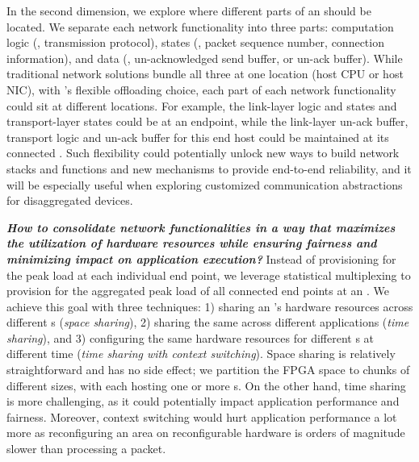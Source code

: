 In the second dimension, we explore where different parts of an \nt{} should be located.
We separate each network functionality into three parts: computation logic (\eg, transmission protocol), states (\eg, packet sequence number, connection information), and data (\eg, un-acknowledged send buffer, or un-ack buffer).
While traditional network solutions bundle all three at one location (host CPU or host NIC), with \sysname's flexible offloading choice, each part of each network functionality could sit at different locations.
For example, the link-layer logic and states and transport-layer states could be at an endpoint, while the link-layer un-ack buffer, transport logic and un-ack buffer for this end host could be maintained at its connected \snic.
Such flexibility could potentially unlock new ways to build network stacks and functions and new mechanisms to provide end-to-end reliability, and it will be especially useful when exploring customized communication abstractions for disaggregated devices.

\vspace{0.05in}
\noindent \textbf{\textit{How to consolidate network functionalities in a way that maximizes the utilization of \snic{} hardware resources while ensuring fairness and minimizing impact on application execution?}}
Instead of provisioning for the peak load at each individual end point, we leverage statistical multiplexing to provision for the aggregated peak load of all connected end points at an \snic.
We achieve this goal with three techniques: 1) sharing an \snic's hardware resources across different \nt{}s ({\em space sharing}), 2) sharing the same \nt{} across different applications ({\em time sharing}), and 3) configuring the same hardware resources for different \nt{}s at different time ({\em time sharing with context switching}).
Space sharing is relatively straightforward and has no side effect; we partition the FPGA space to chunks of different sizes, with each hosting one or more \nt{}s.
On the other hand, time sharing is more challenging, as it could potentially impact application performance and fairness.
Moreover, context switching would hurt application performance a lot more as reconfiguring an area on reconfigurable hardware is orders of magnitude slower than processing a packet.

